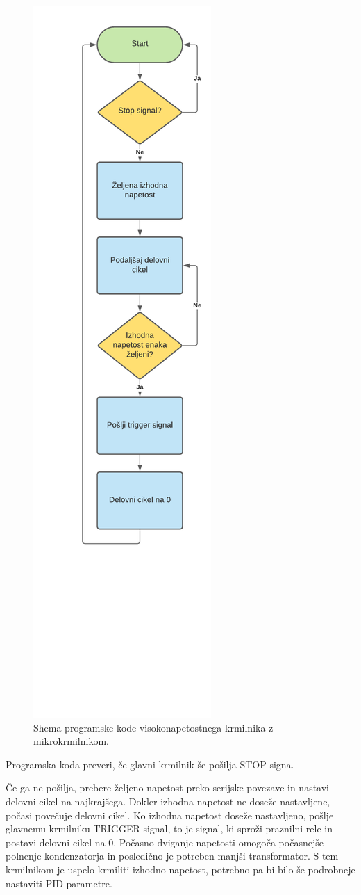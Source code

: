 \documentclass[a4paper,twoside,openright,12pt,Slovene]{book}
\begin{document}
	\begin{figure}[H]
    \centering
    \includegraphics[width=0.35\columnwidth]{Sheme/KrmilnikzuCShema.pdf}
    \caption{\label{KrmilnikzuCShema} Shema programske kode visokonapetostnega krmilnika z mikrokrmilnikom.}
	\end{figure}
	
Programska koda preveri, če glavni krmilnik še pošilja STOP signa. 

Če ga ne pošilja, prebere željeno napetost preko serijske povezave in nastavi delovni cikel na najkrajšega. Dokler izhodna napetost ne doseže nastavljene, počasi povečuje delovni cikel. Ko izhodna napetost doseže nastavljeno, pošlje glavnemu krmilniku TRIGGER signal, to je signal, ki sproži praznilni rele in postavi delovni cikel na 0. Počasno dviganje napetosti omogoča počasnejše polnenje kondenzatorja in posledično je potreben manjši transformator. S tem krmilnikom je uspelo krmiliti izhodno napetost, potrebno pa bi bilo še podrobneje nastaviti PID parametre.
\end{document}
